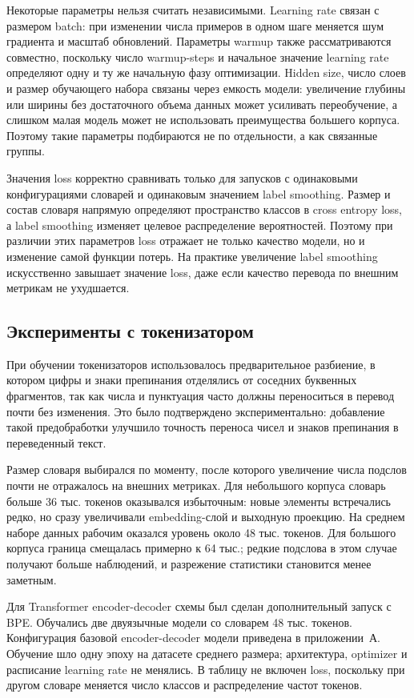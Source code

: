 Некоторые параметры нельзя считать независимыми. Learning rate связан с размером batch: при изменении числа примеров в одном шаге меняется шум градиента и масштаб обновлений. Параметры warmup также рассматриваются совместно, поскольку число warmup-steps и начальное значение learning rate определяют одну и ту же начальную фазу оптимизации. Hidden size, число слоев и размер обучающего набора связаны через емкость модели: увеличение глубины или ширины без достаточного объема данных может усиливать переобучение, а слишком малая модель может не использовать преимущества большего корпуса. Поэтому такие параметры подбираются не по отдельности, а как связанные группы.

Значения loss корректно сравнивать только для запусков с одинаковыми конфигурациями словарей и одинаковым значением label smoothing. Размер и состав словаря напрямую определяют пространство классов в cross entropy loss, а label smoothing изменяет целевое распределение вероятностей. Поэтому при различии этих параметров loss отражает не только качество модели, но и изменение самой функции потерь. На практике увеличение label smoothing искусственно завышает значение loss, даже если качество перевода по внешним метрикам не ухудшается.

\subsection{Эксперименты с токенизатором}

При обучении токенизаторов использовалось предварительное разбиение, в котором цифры и знаки препинания отделялись от соседних буквенных фрагментов, так как числа и пунктуация часто должны переноситься в перевод почти без изменения. Это было подтверждено экспериментально: добавление такой предобработки улучшило точность переноса чисел и знаков препинания в переведенный текст.

Размер словаря выбирался по моменту, после которого увеличение числа подслов почти не отражалось на внешних метриках. Для небольшого корпуса словарь больше 36 тыс. токенов оказывался избыточным: новые элементы встречались редко, но сразу увеличивали embedding-слой и выходную проекцию. На среднем наборе данных рабочим оказался уровень около 48 тыс. токенов. Для большого корпуса граница смещалась примерно к 64 тыс.; редкие подслова в этом случае получают больше наблюдений, и разрежение статистики становится менее заметным.

Для Transformer encoder-decoder схемы был сделан дополнительный запуск с BPE. Обучались две двуязычные модели со словарем 48 тыс. токенов. Конфигурация базовой encoder-decoder модели приведена в приложении~А. Обучение шло одну эпоху на датасете среднего размера; архитектура, optimizer и расписание learning rate не менялись. В таблицу не включен loss, поскольку при другом словаре меняется число классов и распределение частот токенов.


